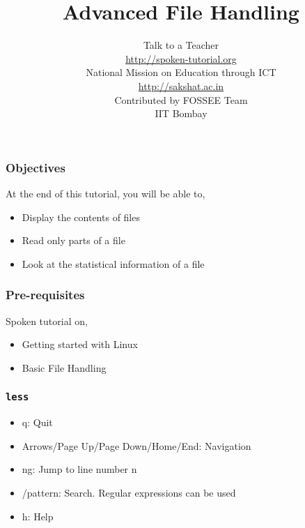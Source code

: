 \documentclass[17pt,compress]{beamer}
\author[FOSSEE]{}
\institute[IIT Bombay]{}
\date[]{}
\begin{document}
\sffamily \bfseries
\title
[Advanced File Handling]
{Advanced File Handling}
\author
[FOSSEE]
{\small Talk to a Teacher\\{\color{blue}\url{http://spoken-tutorial.org}}\\\vspace{0.25cm}National Mission on Education
 through ICT\\{\color{blue}\url{ http://sakshat.ac.in}} \\ [1.65cm]
   Contributed by FOSSEE Team \\IIT Bombay  \\[0.3cm]
}

\begin{frame}
   \titlepage
\end{frame}

\begin{frame}
\frametitle{Objectives}
\label{sec-2}

At the end of this tutorial, you will be able to,
\begin{itemize}
\item Display the contents of files
\item Read only parts of a file
\item Look at the statistical information of a file
\end{itemize}
\end{frame}

\begin{frame}
\frametitle{Pre-requisites}
\label{sec-3}

Spoken tutorial on,
\begin{itemize}
\item Getting started with Linux
\item Basic File Handling
\end{itemize}
\end{frame}

\begin{frame}[fragile]
  \frametitle{\texttt{less}}
   \begin{itemize}
  \item q: Quit
  \item Arrows/Page Up/Page Down/Home/End: Navigation
  \item ng: Jump to line number n
  \item /pattern: Search. Regular expressions can be used
  \item h: Help
  \end{itemize}
\end{frame}
\end{document}
